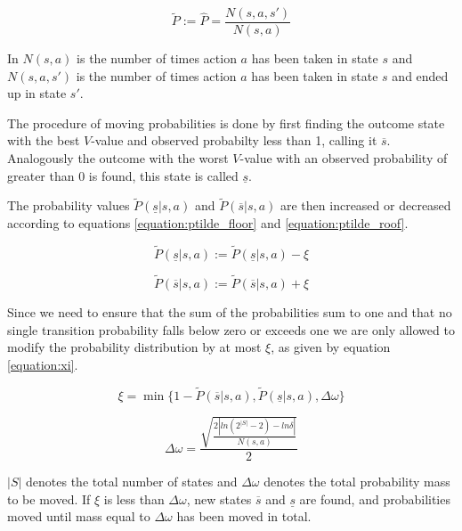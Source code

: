 \begin{equation}
\label{equation:roof}
\tilde{P} := \hat{P} = \frac{N(s,a,s')}{N(s,a)}
\end{equation}

In $N(s, a)$ is the number of times action $a$ has been taken in
state $s$ and $N(s, a, s')$ is the number of times action $a$ has been taken in
state $s$ and ended up in state $s'$.

The procedure of moving probabilities is done by first finding the outcome
state with the best $V$-value and observed probabilty less than 1, calling it
$\overline{s}$. Analogously the outcome with the worst $V$-value with an
observed probability of greater than 0 is found, this state is called
$\underline{s}$. 

The probability values $\tilde{P}(\underline{s}|s,a)$ and
$\tilde{P}(\overline{s}|s,a)$ are then increased or decreased according to
equations \eqref{equation:ptilde_floor} and \eqref{equation:ptilde_roof}.

\begin{equation}
\label{equation:ptilde_floor}
\tilde{P}(\underline{s}|s,a) := \tilde{P}(\underline{s}|s,a)-\xi
\end{equation}

\begin{equation}
\label{equation:ptilde_roof}
\tilde{P}(\overline{s}|s,a) := \tilde{P}(\overline{s}|s,a)+\xi
\end{equation}

Since we need to ensure that the sum of the probabilities sum to one and that
no single transition probability falls below zero or exceeds one we are only
allowed to modify the probability distribution by at most $\xi$, as given by
equation \ref{equation:xi}. 

\begin{equation}
\label{equation:xi}
\xi = \min\{
  1 - \tilde{P}(\overline{s} | s, a)
  , \tilde{P}(\underline{s} | s, a)
  , \Delta \omega 
\}
\end{equation}

\begin{equation}
  \Delta \omega = \frac{\sqrt{\frac{2|ln(2^{|S|}-2) - ln  \delta |}{N(s,a)}}}{2}
\end{equation}

$|S|$ denotes the total number of states and $\Delta \omega$ denotes the total
probability mass to be moved. If $\xi$ is less than $\Delta \omega$, new states
$\overline{s}$ and $\underline{s}$ are found, and probabilities moved until
mass equal to $\Delta \omega$ has been moved in total. 

